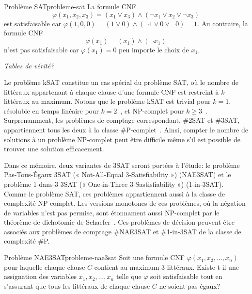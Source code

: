 \begin{example}{Problème SAT}{probleme-sat}
    La formule CNF
    \begin{equation*}
        \varphi(x_{1}, x_{2}, x_{3}) = (x_{1} \lor x_{3}) \land (\neg x_{1} \lor x_{2} \lor \neg x_{3}) 
    \end{equation*}
    est satisfaisable car $\varphi(1,0,0) = (1 \lor 0) \land (\neg 1 \lor 0 \lor \neg 0) = 1$. Au contraire, la formule CNF
    \begin{equation*}
        \varphi(x_{1})= (x_{1}) \land (\neg x_{1})
    \end{equation*}
    n'est pas satisfaisable car $\varphi (x_{1}) = 0$ peu importe le choix de $x_{1}$.
\end{example}

\textcolor{mydarkred}{\textit{Tables de vérité?}}

Le problème kSAT constitue un cas spécial du problème SAT, où le nombre de littéraux appartenant à chaque clause d'une formule CNF est restreint à $k$ littéraux au maximum. Notons que le problème kSAT est trivial pour $k=1$, résoluble en temps linéaire pour $k=2$~\cite{kromDecisionProblemClass1967}, et \textsf{NP}-complet pour $k \geq 3$~\cite{karpReducibilityCombinatorialProblems1972}. Surprenamment, les problèmes de comptage correspondant, \#2SAT et \#3SAT, appartiennent tous les deux à la classe \textsf{\#P}-complet~\cite{valiantComplexityEnumerapportnReliability1979}. Ainsi, compter le nombre de solutions à un problème \textsf{NP}-complet peut être difficile même s'il est possible de trouver une solution efficacement.

Dans ce mémoire, deux variantes de 3SAT seront portées à l'étude: le problème Pas-Tous-Égaux 3SAT (« Not-All-Equal 3-Satisfiability ») (NAE3SAT) et le problème 1-dans-3 3SAT (« One-in-Three 3-Sastisfiability ») (1-in-3SAT). 
Comme le problème SAT, ces problèmes appartiennent aussi à la classe de complexité \textsf{NP}-complet. Les versions monotones de ces problèmes, où la négation de variables n'est pas permise, sont étonnament aussi \textsf{NP}-complet par le théorème de dichotomie de Schaefer~\cite{schaeferComplexitySatisfiabilityProblems1978}. Ces problèmes de décision peuvent être associés aux problèmes de comptage \#NAE3SAT et \#1-in-3SAT de la classe de complexité \textsf{\#P}.

\begin{maindefinition}{Problème NAE3SAT}{probleme-nae3sat}
    Soit une formule CNF $\varphi(x_{1}, x_{2}, \dots, x_{n})$ pour laquelle chaque clause $C$ contient au maximum 3 littéraux. Existe-t-il une assignation des variables $x_{1}, x_{2}, \dots, x_{n}$ telle que $\varphi$ soit satisfaisable tout en s'assurant que tous les littéraux de chaque clause $C$ ne soient pas égaux?
\end{maindefinition}

